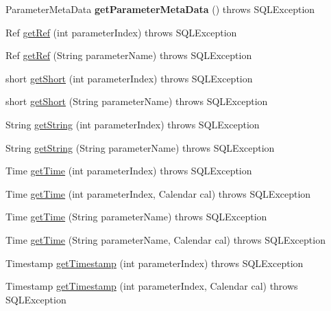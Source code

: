 \begin{DoxyCompactItemize}
Parameter\+Meta\+Data {\bfseries get\+Parameter\+Meta\+Data} ()  throws S\+Q\+L\+Exception 
\item 
Ref \mbox{\hyperlink{classcom_1_1mysql_1_1jdbc_1_1_callable_statement_a8c00f111b4c99ac186f1b25164c8f97a}{get\+Ref}} (int parameter\+Index)  throws S\+Q\+L\+Exception 
\item 
Ref \mbox{\hyperlink{classcom_1_1mysql_1_1jdbc_1_1_callable_statement_a2e8c60ffce328cdca3f615add21e7ea4}{get\+Ref}} (String parameter\+Name)  throws S\+Q\+L\+Exception 
\item 
short \mbox{\hyperlink{classcom_1_1mysql_1_1jdbc_1_1_callable_statement_aa7732fb063990b1e3719aa6d33f0ba7c}{get\+Short}} (int parameter\+Index)  throws S\+Q\+L\+Exception 
\item 
short \mbox{\hyperlink{classcom_1_1mysql_1_1jdbc_1_1_callable_statement_af83744782126809276a8ddb6219abc7f}{get\+Short}} (String parameter\+Name)  throws S\+Q\+L\+Exception 
\item 
String \mbox{\hyperlink{classcom_1_1mysql_1_1jdbc_1_1_callable_statement_a0ab71db7ed9b1f94b739305284590da0}{get\+String}} (int parameter\+Index)  throws S\+Q\+L\+Exception 
\item 
String \mbox{\hyperlink{classcom_1_1mysql_1_1jdbc_1_1_callable_statement_aed6520b46a5b20440346fb9a487a8bdf}{get\+String}} (String parameter\+Name)  throws S\+Q\+L\+Exception 
\item 
Time \mbox{\hyperlink{classcom_1_1mysql_1_1jdbc_1_1_callable_statement_a87f8ac6155e026c518be1266abd3da5c}{get\+Time}} (int parameter\+Index)  throws S\+Q\+L\+Exception 
\item 
Time \mbox{\hyperlink{classcom_1_1mysql_1_1jdbc_1_1_callable_statement_acba23c4f64d5f8dcbf2af7e8fe4239f0}{get\+Time}} (int parameter\+Index, Calendar cal)  throws S\+Q\+L\+Exception 
\item 
Time \mbox{\hyperlink{classcom_1_1mysql_1_1jdbc_1_1_callable_statement_a12256fce41eba515d055b3b2a9d75d0f}{get\+Time}} (String parameter\+Name)  throws S\+Q\+L\+Exception 
\item 
Time \mbox{\hyperlink{classcom_1_1mysql_1_1jdbc_1_1_callable_statement_af552f75778c2ff1df5e7ef47014e5810}{get\+Time}} (String parameter\+Name, Calendar cal)  throws S\+Q\+L\+Exception 
\item 
Timestamp \mbox{\hyperlink{classcom_1_1mysql_1_1jdbc_1_1_callable_statement_aa0263246593571a7c5a1caf704ad3eec}{get\+Timestamp}} (int parameter\+Index)  throws S\+Q\+L\+Exception 
\item 
Timestamp \mbox{\hyperlink{classcom_1_1mysql_1_1jdbc_1_1_callable_statement_a66ee1944b2e584b14ae505fccda376e7}{get\+Timestamp}} (int parameter\+Index, Calendar cal)  throws S\+Q\+L\+Exception 

\end{DoxyCompactItemize}
